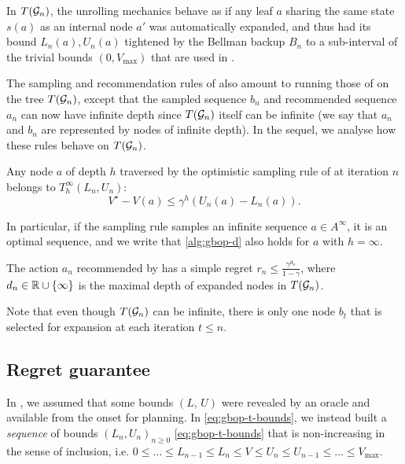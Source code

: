 \documentclass[runningheads]{llncs}
\begin{document}
In $T(\mathcal{G}_n)$, the unrolling mechanics behave as if any leaf $a$ sharing the same state $s(a)$ as an internal node $a'$ was automatically expanded, and thus had its bound $L_n(a), U_n(a)$ tightened by the Bellman backup $B_n$ to a sub-interval of the trivial bounds $(0, V_{\max})$ that are used in \OPD.

The sampling and recommendation rules of \GBOPD also amount to running those of \OPD on the tree $T(\mathcal{G}_n)$, except that the sampled sequence $b_n$ and recommended sequence $a_n$ can now have infinite depth since $T(\mathcal{G}_n)$ itself can be infinite (we say that $a_n$ and $b_n$ are represented by nodes of infinite depth). In the sequel, we analyse how these rules behave on $T(\mathcal{G}_n)$.

\begin{lemma}[Expansion]
	\label{lem:expansion-bound}
	Any node $a$ of depth $h$ traversed by the optimistic sampling rule of \GBOPD at iteration $n$ belongs to $T_h^\infty(L_n, U_n)$: 
	\begin{equation}
	\label{eq:expansion-regret}
	V^\star-V(a) \leq \gamma^h(U_n(a)-L_n(a)).
	\end{equation}
	
	In particular, if the sampling rule samples an infinite sequence $a\in A^\infty$, it is an optimal sequence, and we write that \eqref{alg:gbop-d} also holds for $a$ with $h=\infty$.
\end{lemma}


\begin{lemma}[Recommendation]
	\label{lem:recommendation-bound}
	The action $a_n$ recommended by \GBOPD has a simple regret $r_n \leq \frac{\gamma^{d_n}}{1-\gamma}$, where $d_n\in\mathbb{R}\cup\{\infty\}$ is the maximal depth of expanded nodes in $T(\mathcal{G}_n)$.
\end{lemma}
Note that even though $T(\mathcal{G}_n)$ can be infinite, there is only one node $b_t$ that is selected for expansion at each iteration $t\leq n$.

\subsection{Regret guarantee}

In , we assumed that some bounds $(L,\,U)$ were revealed by an oracle and available from the onset for planning. In \eqref{eq:gbop-t-bounds}, we instead built a \emph{sequence} of bounds $(L_n,U_n)_{n\geq 0}$ \eqref{eq:gbop-t-bounds} that is non-increasing in the sense of inclusion, i.e. $0\leq \dots\leq L_{n-1}\leq L_n\leq V\leq U_n\leq U_{n-1}\leq \dots\leq V_{\max}$.
\end{document}
